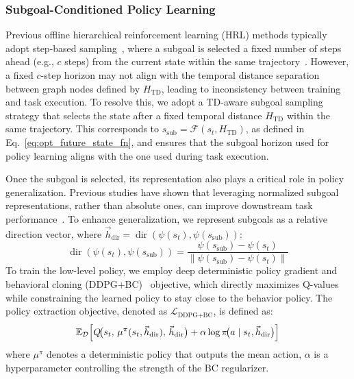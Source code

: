 \documentclass{article}
\begin{document}
\subsubsection{Subgoal-Conditioned Policy Learning} 
\label{sec:subgoal_conditioned_policy_learning}
Previous offline hierarchical reinforcement learning (HRL) methods typically adopt step-based sampling~\cite{ajay2021opal, shin2023guide, li2024boosting}, where a subgoal is selected a fixed number of steps ahead (e.g., \( c \) steps) from the current state within the same trajectory~\cite{park2023hiql, park2024foundation}. However, a fixed \( c \)-step horizon may not align with the temporal distance separation between graph nodes defined by \( H_{\text{TD}} \), leading to inconsistency between training and task execution. To resolve this, we adopt a TD-aware subgoal sampling strategy that selects the state after a fixed temporal distance \( H_{\text{TD}} \) within the same trajectory. This corresponds to \( s_{\text{sub}} = \mathcal{F}(s_t, H_{\text{TD}}) \), as defined in Eq.~\eqref{eq:opt_future_state_fn}, and ensures that the subgoal horizon used for policy learning aligns with the one used during task execution. 

Once the subgoal is selected, its representation also plays a critical role in policy generalization. Previous studies have shown that leveraging normalized subgoal representations, rather than absolute ones, can improve downstream task performance~\cite{park2023hiql, park2024foundation}. To enhance generalization, we represent subgoals as a relative direction vector, where 
\( \vec{h}_{\mathrm{dir}} = \operatorname{dir}(\psi(s_t), \psi(s_{\text{sub}})) \):
\begin{equation}
\label{eq:directional_subgoal}
\operatorname{dir}(\psi(s_{t}),\psi(s_{\text{sub}})) = 
\frac{\psi(s_{\text{sub}}) - \psi(s_{t})}{\|\psi(s_{\text{sub}}) - \psi(s_{t})\|}
\end{equation}
To train the low-level policy, we employ deep deterministic policy gradient and behavioral cloning (DDPG+BC)~\cite{lillicrap2016continuous, fujimoto2021minimalist, park2024value} objective, which directly maximizes Q-values while constraining the learned policy to stay close to the behavior policy. The policy extraction objective, denoted as \( \mathcal{L}_{\text{DDPG+BC}} \), is defined as:
\begin{equation}
\mathbb{E}_{\mathcal{D}}
\Bigl[Q\!\bigl(s_{t},\,\mu^\pi(s_{t},\vec{h}_\text{dir}),\,\vec{h}_\text{dir}\bigr) + \alpha \log \pi\!\bigl(a \mid s_{t},\vec{h}_\text{dir}\bigr)\Bigr]
\end{equation}
where \( \mu^\pi \) denotes a deterministic policy that outputs the mean action, \( \alpha \) is a hyperparameter controlling the strength of the BC regularizer. 
\end{document}
